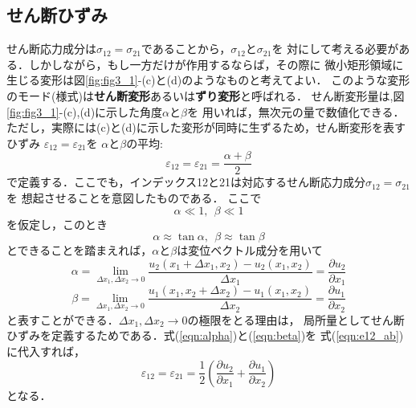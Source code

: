 \documentclass[10pt,a4j]{jbook}
\begin{document}
\subsection{せん断ひずみ}
せん断応力成分は$\sigma_{12}=\sigma_{21}$であることから，$\sigma_{12}$と$\sigma_{21}$を
対にして考える必要がある．しかしながら，もし一方だけが作用するならば，その際に
微小矩形領域に生じる変形は図\ref{fig:fig3_1}-(c)と(d)のようなものと考えてよい．
このような変形のモード(様式)は{\bf せん断変形}あるいは{\bf ずり変形}と呼ばれる．
せん断変形量は,図\ref{fig:fig3_1}-(c),(d)に示した角度$\alpha$と$\beta$を
用いれば，無次元の量で数値化できる．
ただし，実際には(c)と(d)に示した変形が同時に生ずるため，せん断変形を表すひずみ
$\varepsilon_{12}=\varepsilon_{21}$を
$\alpha$と$\beta$の平均:
\begin{equation}
	\varepsilon_{12}=\varepsilon_{21}=\frac{\alpha+\beta}{2}
	\label{eqn:e12_ab}
\end{equation}
で定義する．ここでも，インデックス12と21は対応するせん断応力成分$\sigma_{12}=\sigma_{21}$を
想起させることを意図したものである．
ここで
\begin{equation}
	\alpha \ll 1, \ \ \beta \ll 1
\end{equation}
を仮定し，このとき
\begin{equation}
	\alpha \approx \tan \alpha, \ \ 
	\beta \approx \tan \beta 
\end{equation}
とできることを踏まえれば，$\alpha$と$\beta$は変位ベクトル成分を用いて
\begin{equation}
	\alpha=
	\lim_{\Delta x_1,\Delta x_2 \rightarrow 0}
	\frac{u_2(x_1+\Delta x_1,x_2)-u_2(x_1,x_2)}{\Delta x_1}
	=\frac{\partial u_2}{\partial x_1}
	\label{eqn:alpha}
\end{equation}
\begin{equation}
	\beta=
	\lim_{\Delta x_1,\Delta x_2 \rightarrow 0}
	\frac{u_1(x_1,x_2+\Delta x_2)-u_1(x_1,x_2)}{\Delta x_2}
	=\frac{\partial u_1}{\partial x_2}
	\label{eqn:beta}
\end{equation}
と表すことができる．$\Delta x_1,\Delta x_2\rightarrow 0$の極限をとる理由は，
局所量としてせん断ひずみを定義するためである．式(\ref{eqn:alpha})と(\ref{eqn:beta})を
式(\ref{eqn:e12_ab})に代入すれば，
\begin{equation}
	\varepsilon_{12}=
	\varepsilon_{21}=
	\frac{1}{2}
	\left(
	\frac{\partial u_2}{\partial x_1}
	+
	\frac{\partial u_1}{\partial x_2}
	\right)
	\label{eqn:def_e12}
\end{equation}
となる．\\
\end{document}
